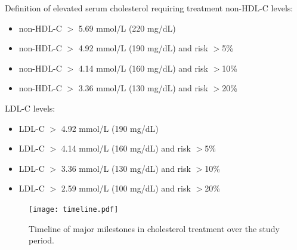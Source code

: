 \documentclass[12pt]{article}
\begin{document}
\begin{refsection}
\singlespacing

\clearpage

\onehalfspacing

\clearpage


\begin{mybox}[floatplacement=p,label={box:first}]{Definition of elevated serum cholesterol requiring treatment}
non-HDL-C levels:
    \begin{itemize}
        \item non-HDL-C $>$ 5.69 mmol/L (220 mg/dL)
        \item non-HDL-C $>$ 4.92 mmol/L (190 mg/dL) and risk $>$5\% 
        \item non-HDL-C $>$ 4.14 mmol/L (160 mg/dL) and risk $>$10\%
        \item non-HDL-C $>$ 3.36 mmol/L (130 mg/dL) and risk $>$20\%
    \end{itemize}

LDL-C levels:
    \begin{itemize}
        \item LDL-C $>$ 4.92 mmol/L (190 mg/dL)
        \item LDL-C $>$ 4.14 mmol/L (160 mg/dL) and risk $>$5\% 
        \item LDL-C $>$ 3.36 mmol/L (130 mg/dL) and risk $>$10\%
        \item LDL-C $>$ 2.59 mmol/L (100 mg/dL) and risk $>$20\%
    \end{itemize}
\end{mybox}

\clearpage

\begin{figure}[p]
    \centering
    \texttt{[image: timeline.pdf]}
    \caption{Timeline of major milestones in cholesterol treatment over the study period.}
    \label{fig:timeline}
\end{figure}

\clearpage



\begin{landscape}


\end{landscape}
\end{refsection}
\end{document}
